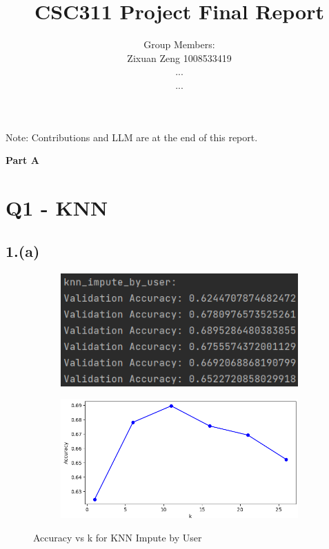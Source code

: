 \documentclass{article}
\title{CSC311 Project Final Report}
\author{Group Members: \\ Zixuan Zeng 1008533419 \\ ... \\ ...}
\begin{document}
\maketitle

Note: Contributions and LLM are at the end of this report.

\newpage
\vspace*{5cm}
\begin{center}
\Large\bfseries Part A
\end{center}
\newpage

\section*{Q1 - KNN}

\subsection*{1.(a)}

\begin{figure}[H]
    \centering
    \begin{subfigure}{0.45\textwidth}
        \includegraphics[width=\textwidth]{knn_impute_by_user_result.png}
    \end{subfigure}
    \hfill
    \begin{subfigure}{0.45\textwidth}
        \includegraphics[width=\textwidth]{knn_impute_by_user_plot.png}
    \end{subfigure}
    \caption{Accuracy vs k for KNN Impute by User}
\end{figure}
\end{document}
